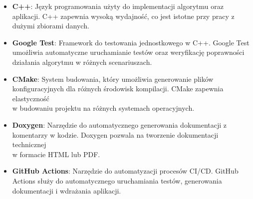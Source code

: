 \begin{itemize}
  \item \textbf{C++}: Język programowania użyty do implementacji algorytmu oraz aplikacji. C++ zapewnia wysoką wydajność, co jest istotne przy pracy z dużymi zbiorami danych.
  \item \textbf{Google Test}: Framework do testowania jednostkowego w C++. Google Test umożliwia automatyczne uruchamianie testów oraz weryfikację poprawności działania algorytmu w różnych scenariuszach.
  \item \textbf{CMake}: System budowania, który umożliwia generowanie plików konfiguracyjnych dla różnych środowisk kompilacji. CMake zapewnia elastyczność \\ w budowaniu projektu na różnych systemach operacyjnych.
  \item \textbf{Doxygen}: Narzędzie do automatycznego generowania dokumentacji z komentarzy w kodzie. Doxygen pozwala na tworzenie dokumentacji technicznej \\ w formacie HTML lub PDF.
  \item \textbf{GitHub Actions}: Narzędzie do automatyzacji procesów CI/CD. GitHub Actions służy do automatycznego uruchamiania testów, generowania dokumentacji i wdrażania aplikacji.
\end{itemize}
